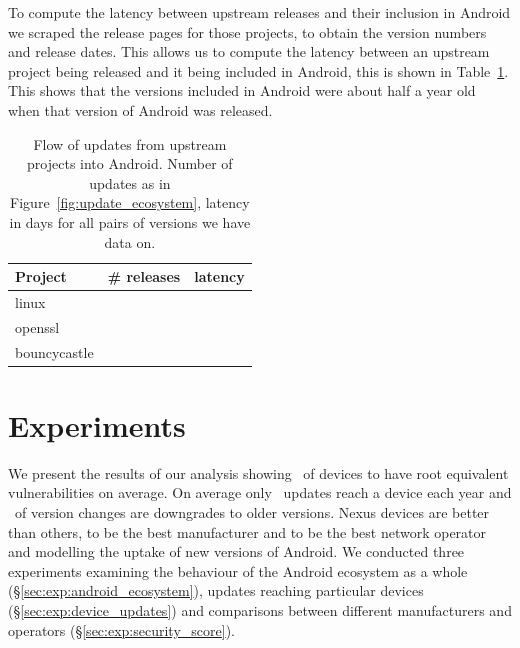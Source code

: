 \documentclass[conference,a4paper,twoside]{IEEEtran}
\let\OldTodo\todo
\renewcommand{\todo}{\OldTodo[inline]}
\newcommand{\todolater}[1]{}%
\begin{document}
To compute the latency between upstream releases and their inclusion in Android we scraped the release pages for those projects, to obtain the version numbers and release dates.
This allows us to compute the latency between an upstream project being released and it being included in Android, this is shown in Table~\ref{tab:update_ecosystem}.
This shows that the versions included in Android were about half a year old when that version of Android was released.
\begin{table}
\centering
\begin{tabular}{l|r|r}
Project	&	\# releases	&	latency \\ \hline
linux	&	\linuxNumVersions	&	\linuxMeanUpdateLatency \\
openssl	&	\opensslNumVersions	&	\opensslMeanUpdateLatency \\
bouncycastle	&	\bouncycastleNumVersions	&	\bouncycastleMeanUpdateLatency \\
\end{tabular}
\caption{Flow of updates from upstream projects into Android. Number of updates as in Figure~\ref{fig:update_ecosystem}, latency in days for all pairs of versions we have data on.\todolater{scrape the other 26 websites... is it worth it?}}
\label{tab:update_ecosystem}
\end{table}






\section{Experiments}
\label{sec:results}
We present the results of our analysis showing \daMeanInsecurityPerc\ of devices to have root equivalent vulnerabilities on average.
On average only \daUpdatesPerYear\ updates reach a device each year and \daPercUpdatesDowngrades\ of version changes are downgrades to older versions.
Nexus devices are better than others, \emph{\daSecScoreBestmanufacturer} to be the best manufacturer and \emph{\daSecScoreBestoperator} to be the best network operator and modelling the uptake of new versions of Android.
We conducted three experiments examining the behaviour of the Android ecosystem as a whole (\S\ref{sec:exp:android_ecosystem}), updates reaching particular devices (\S\ref{sec:exp:device_updates}) and comparisons between different manufacturers and operators (\S\ref{sec:exp:security_score}).
\end{document}
